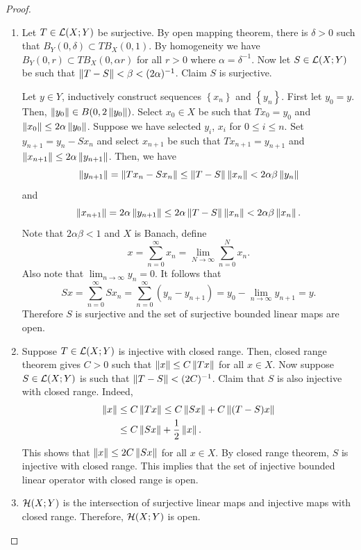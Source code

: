 \documentclass[a4paper]{article}
\begin{document}
\begin{proof}
\begin{enumerate}
\item Let $T \in \mathcal{L}(X; Y)$ be surjective. By open mapping
theorem, there is $\delta > 0$ such that $B_Y(0, \delta)
\subset TB_X(0, 1)$. By homogeneity we have
$B_Y(0, r) \subset TB_X(0, \alpha r)$ for all $r > 0$ where
$\alpha = \delta^{-1}$. Now let $S \in \mathcal{L}(X; Y)$ be such that
$\left\lVert T - S\right\rVert < \beta < (2\alpha)^{-1}$. Claim $S$ is surjective.

Let $y \in Y$, inductively construct sequences $\left\{ x_n \right\}$
and $\left\{ y_n \right\}$. First let $y_0 = y$. Then,
$\left\lVert y_0\right\rVert \in B(0, 2\left\lVert y_0\right\rVert)$. Select
$x_0 \in X$ be such that $T x_0 = y_0$ and $\left\lVert x_0\right\rVert
\leq 2 \alpha \left\lVert y_0\right\rVert$. Suppose we have selected $y_i$,
$x_i$ for $0 \leq i \leq n$. Set $y_{n+1} = y_n - S x_n$
and select $x_{n+1}$ be such that $T x_{n+1} = y_{n+1}$
and $\left\lVert x_{n+1}\right\rVert \leq 2\alpha \left\lVert y_{n+1}\right\rVert$.
Then, we have
\[
\left\lVert y_{n+1}\right\rVert = \left\lVert T x_n - S x_n\right\rVert \leq
\left\lVert T - S\right\rVert \left\lVert x_n\right\rVert < 2 \alpha\beta \left\lVert y_n\right\rVert
\]
and
\[
\left\lVert x_{n+1}\right\rVert = 2 \alpha \left\lVert y_{n+1}\right\rVert \leq
2 \alpha \left\lVert T - S\right\rVert \left\lVert x_n\right\rVert < 2 \alpha \beta \left\lVert x_n\right\rVert.
\]
Note that $2 \alpha\beta < 1$ and $X$ is Banach, define
\[
x = \sum_{n=0}^\infty x_n = \lim_{N \to \infty}
\sum_{n = 0}^N x_n.
\]
Also note that $\lim_{n \to \infty} y_n = 0$. It follows
that
\[
S x = \sum_{n=0}^\infty S x_n
= \sum_{n=0}^\infty (y_n - y_{n+1})
= y_0 - \lim_{n \to \infty} y_{n+1} = y.
\]
Therefore $S$ is surjective and the set of surjective
bounded linear maps are open.

\item Suppose $T \in \mathcal{L}(X; Y)$ is injective with closed range.
Then, closed range theorem gives $C > 0$ such that
$\left\lVert x\right\rVert \leq C \left\lVert T x\right\rVert$ for all $x \in X$. Now suppose
$S \in \mathcal{L}(X; Y)$ is such that $\left\lVert T - S\right\rVert < (2C)^{-1}$.
Claim that $S$ is also injective with closed range. Indeed,
\[
\begin{aligned}
  \left\lVert x\right\rVert &\leq C\left\lVert T x\right\rVert \leq C \left\lVert Sx\right\rVert + C \left\lVert (T-S)x\right\rVert \\
  & \leq C \left\lVert Sx\right\rVert + \frac{1}{2}\left\lVert x\right\rVert.
\end{aligned}
\]
This shows that $\left\lVert x\right\rVert \leq 2C \left\lVert Sx\right\rVert$ for all $x \in X$.
By closed range theorem, $S$ is injective with closed range.
This implies that the set of injective bounded linear operator
with closed range is open.

\item $\mathcal{H}(X; Y)$ is the intersection of surjective linear
maps and injective maps with closed range. Therefore, 
$\mathcal{H}(X; Y)$ is open.
\end{enumerate}

\end{proof}
\end{document}
